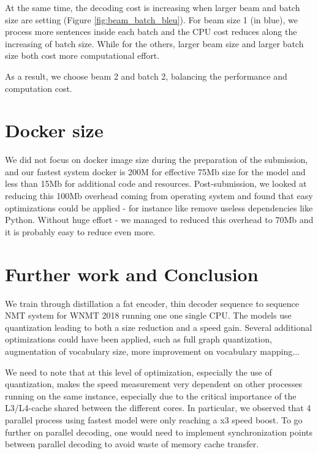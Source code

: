 \documentclass[11pt,a4paper]{article}
\begin{document}
%

At the same time, the decoding cost is increasing when larger beam and batch size are setting (Figure \ref{fig:beam_batch_bleu}).
For beam size 1 (in blue), we process more sentences inside each batch and the CPU cost reduces along the increasing of batch size.
While for the others, larger beam size and larger batch size both cost more computational effort.

As a result, we choose beam 2 and batch 2, balancing the performance and computation cost.

%

\section{Docker size}
We did not focus on docker image size during the preparation of the submission, and our fastest system docker is 200M for effective 75Mb size for the model and less than 15Mb for additional code and resources. Post-submission, we looked at reducing this 100Mb overhead coming from operating system and found that easy optimizations could be applied - for instance like remove useless dependencies like Python. Without huge effort - we managed to reduced this overhead to 70Mb and it is probably easy to reduce even more.

\section{Further work and Conclusion}

We train through distillation a fat encoder, thin decoder sequence to sequence NMT system for WNMT 2018 running one one single CPU. The models use quantization leading to both a size reduction and a speed gain. Several additional optimizations could have been applied, such as full graph quantization, augmentation of vocabulary size, more improvement on vocabulary mapping...


We need to note that at this level of optimization, especially the use of quantization, makes the speed measurement very dependent on other processes running on the same instance, especially due to the critical importance of the L3/L4-cache shared between the different cores. In particular, we observed that 4 parallel process using fastest model were only reaching a x3 speed boost. To go further on parallel decoding, one would need to implement synchronization points between parallel decoding to avoid waste of memory cache transfer.
\end{document}
